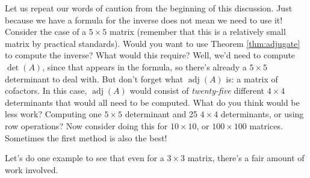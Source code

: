 \smallskip


\smallskip


Let us repeat our words of caution from the beginning of this discussion. Just because we have a formula for the inverse does not mean we need to use it! Consider the case of a $5\times 5$ matrix (remember that this is a relatively small matrix by practical standards). Would you want to use Theorem \ref{thm:adjugate} to compute the inverse? What would this require? Well, we'd need to compute $\det(A)$, since that appears in the formula, so there's already a $5\times 5$ determinant to deal with. But don't forget what $\operatorname{adj}(A)$ is: a matrix of cofactors. In this case, $\operatorname{adj}(A)$ would consist of \textit{twenty-five} different $4\times 4$ determinants that would all need to be computed. What do you think would be less work? Computing one $5\times 5$ determinant and 25 $4\times 4$ determinants, or using row operations? Now consider doing this for $10\times 10$, or $100\times 100$ matrices. Sometimes the first method is also the best!

Let's do one example to see that even for a $3\times 3$ matrix, there's a fair amount of work involved.

\medskip

